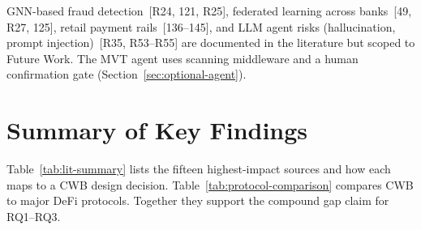 \documentclass[12pt,a4paper]{report}
\begin{document}
GNN-based fraud detection~[R24, 121, R25], federated learning across banks~[49, R27, 125], retail payment rails~[136--145], and LLM agent risks (hallucination, prompt injection)~[R35, R53--R55] are documented in the literature but scoped to Future Work. The MVT agent uses scanning middleware and a human confirmation gate (Section~\ref{sec:optional-agent}).

\section{Summary of Key Findings}
\label{sec:comparative-protocol}

Table~\ref{tab:lit-summary} lists the fifteen highest-impact sources and how each maps to a CWB design decision. Table~\ref{tab:protocol-comparison} compares CWB to major DeFi protocols. Together they support the compound gap claim for RQ1--RQ3.
\end{document}

